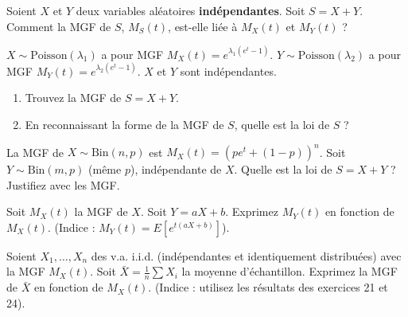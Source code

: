 
\begin{exercicebox}
Soient $X$ et $Y$ deux variables aléatoires \textbf{indépendantes}. Soit $S = X+Y$.
Comment la MGF de $S$, $M_S(t)$, est-elle liée à $M_X(t)$ et $M_Y(t)$ ?
\end{exercicebox}

\begin{exercicebox}
$X \sim \text{Poisson}(\lambda_1)$ a pour MGF $M_X(t) = e^{\lambda_1(e^t - 1)}$.
$Y \sim \text{Poisson}(\lambda_2)$ a pour MGF $M_Y(t) = e^{\lambda_2(e^t - 1)}$.
$X$ et $Y$ sont indépendantes.
\begin{enumerate}
    \item Trouvez la MGF de $S = X+Y$.
    \item En reconnaissant la forme de la MGF de $S$, quelle est la loi de $S$ ?
\end{enumerate}
\end{exercicebox}

\begin{exercicebox}
La MGF de $X \sim \text{Bin}(n, p)$ est $M_X(t) = (p e^t + (1-p))^n$.
Soit $Y \sim \text{Bin}(m, p)$ (même $p$), indépendante de $X$.
Quelle est la loi de $S = X+Y$ ? Justifiez avec les MGF.
\end{exercicebox}

\begin{exercicebox}
Soit $M_X(t)$ la MGF de $X$. Soit $Y = aX + b$.
Exprimez $M_Y(t)$ en fonction de $M_X(t)$.
(Indice : $M_Y(t) = E[e^{t(aX+b)}]$).
\end{exercicebox}

\begin{exercicebox}
Soient $X_1, \dots, X_n$ des v.a. i.i.d. (indépendantes et identiquement distribuées) avec la MGF $M_X(t)$.
Soit $\bar{X} = \frac{1}{n} \sum X_i$ la moyenne d'échantillon.
Exprimez la MGF de $\bar{X}$ en fonction de $M_X(t)$.
(Indice : utilisez les résultats des exercices 21 et 24).
\end{exercicebox}